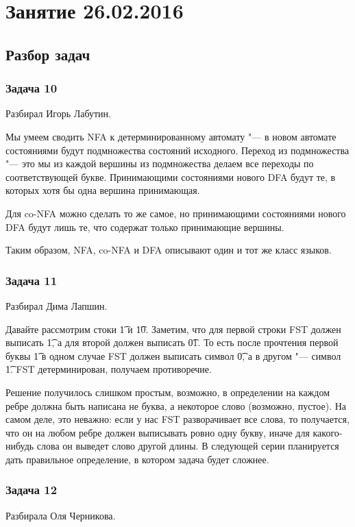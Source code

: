 \chapter{Занятие 26.02.2016}
\section{Разбор задач}

\subsection{Задача 10}
	Разбирал Игорь Лабутин.

	Мы умеем сводить NFA к детерминированному автомату "--- в новом
	автомате состояниями будут подмножества состояний исходного.
	Переход из подмножества "--- это мы из каждой вершины из подмножества
	делаем все переходы по соответствующей букве.
	Принимающими состояниями нового DFA будут те, в которых хотя бы одна вершина принимающая.

	Для co-NFA можно сделать то же самое, но принимающими состояниями нового DFA
	будут лишь те, что содержат только принимающие вершины.

	Таким образом, NFA, co-NFA и DFA описывают один и тот же класс языков.

\subsection{Задача 11}
	Разбирал Дима Лапшин.

	Давайте рассмотрим стоки \t{1} и \t{10}.
	Заметим, что для первой строки FST должен выписать \t{1},
	а для второй должен выписать \t{01}.
	То есть после прочтения первой буквы \t{1} в одном случае FST
	должен выписать символ \t{0}, а в другом "--- символ \t{1}.
	FST детерминирован, получаем противоречие.

	Решение получилось слишком простым, возможно, в определении на каждом
	ребре должна быть написана не буква, а некоторое слово (возможно, пустое).
	На самом деле, это неважно: если у нас FST разворачивает все слова,
	то получается, что он на любом ребре должен выписывать ровно одну букву,
	иначе для какого-нибудь слова он выведет слово другой длины.
	В следующей серии планируется дать правильное определение, в котором задача будет сложнее.

\subsection{Задача 12}
	Разбирала Оля Черникова.

